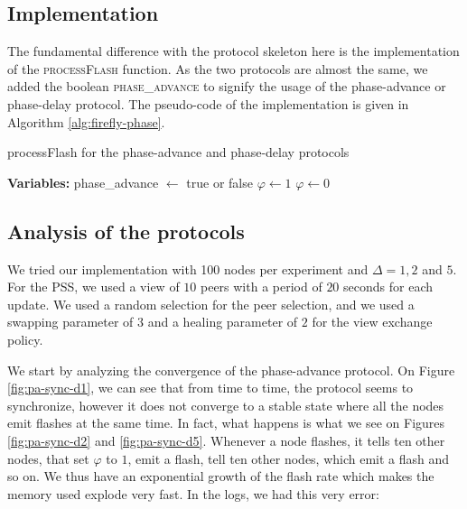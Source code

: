\documentclass[a4paper, 11pt]{article}
\renewcommand{\phi}{\varphi}
\theoremstyle{plain}
\theoremstyle{definition}
\begin{document}
  \subsection{Implementation}
  \label{sec:implementation}

    The fundamental difference with the protocol skeleton here is the implementation of the
    \textsc{processFlash} function. As the two protocols are almost the same, we added the boolean
    \textsc{phase\_advance} to signify the usage of the phase-advance or phase-delay protocol. The pseudo-code
    of the implementation is given in Algorithm \ref{alg:firefly-phase}.

    \begin{algorithm}
     \caption{processFlash for the phase-advance and phase-delay protocols}
     \label{alg:firefly-phase}
     \begin{algorithmic}
       \State \textbf{Variables:}
       \State phase\_advance $\gets$ true or false      
       \State
           \State $\phi \gets 1$
         \Else
           \State $\phi \gets 0$
         \EndIf
       \EndFunction
     \end{algorithmic}
   \end{algorithm}



   \subsection{Analysis of the protocols}
   \label{sec:analysis-protocols}

     We tried our implementation with 100 nodes per experiment and $\Delta = 1, 2$ and $5$. For the
     PSS, we used a view of $10$ peers with a period of $20$ seconds for each update. We used a random
     selection for the peer selection, and we used a swapping parameter of $3$ and a healing parameter of $2$
     for the view exchange policy. 

     We start by analyzing the convergence of the phase-advance protocol. On Figure \ref{fig:pa-sync-d1}, we
     can see that from time to time, the protocol seems to synchronize, however it does not converge to a stable state
     where all the nodes emit flashes at the same time. In fact, what happens is what we see on Figures
     \ref{fig:pa-sync-d2} and \ref{fig:pa-sync-d5}. Whenever a node flashes, it tells ten other nodes, that set
     $\phi$ to $1$, emit a flash, tell ten other nodes, which emit a flash and so on. We thus have an
     exponential growth of the flash rate which makes the memory used explode very fast. In the logs, we had
     this very error:
\end{document}
